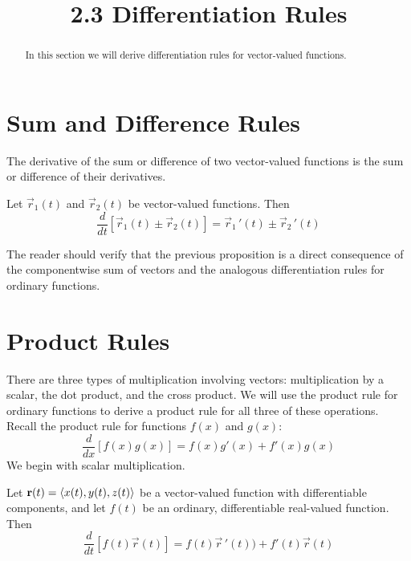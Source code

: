 \documentclass[handout]{ximera}
\title{2.3 Differentiation Rules}
\begin{document}
\begin{abstract}
In this section we will derive differentiation rules for vector-valued functions.
\end{abstract}

\maketitle

\section{Sum and Difference Rules}


The derivative of the sum or difference of two vector-valued functions is the sum or difference of their derivatives.

\begin{proposition}
Let $\vec r_1(t)$ and $\vec r_2(t)$ be vector-valued functions. Then
\[
\frac{d}{dt}\left[\vec r_1(t) \pm \vec r_2(t) \right] = \vec r_1\,'(t) \pm \vec r_2\,'(t)
\]
\end{proposition}
The reader should verify that the previous proposition is a direct consequence of the 
componentwise sum of vectors and the analogous differentiation rules for ordinary functions.

\section{Product Rules}
There are three types of multiplication involving vectors: multiplication by a scalar, the dot product, and the cross product.
We will use the product rule for ordinary functions to derive a product rule for all three of these operations.
Recall the product rule for functions $f(x)$ and $g(x)$:
\[
\frac{d}{dx}\left[f(x)g(x)\right] = f(x)g'(x) + f'(x)g(x)
\]
We begin with scalar multiplication.

\begin{proposition}
Let $\mathbf r(t) = \left\langle x(t), y(t),z(t)\right\rangle$ be a vector-valued function with differentiable components, and let $f(t)$ be an ordinary, differentiable real-valued function.
Then
\[
\frac{d}{dt}\left[f(t)\vec r(t)\right] = f(t)\vec r\,'(t)) + f'(t)\vec r(t)
\]
\end{proposition}
\end{document}
